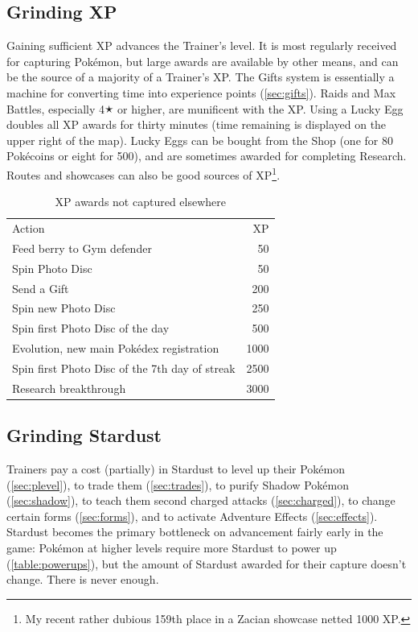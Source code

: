 \subsection{Grinding XP\label{subsec:getxp}}
Gaining sufficient XP advances the Trainer's level.
It is most regularly received for capturing Pokémon, but large awards are
  available by other means, and can be the source of a majority of a Trainer's XP.
The Gifts system is essentially a machine for converting
  time into experience points (\autoref{sec:gifts}).
Raids and Max Battles, especially 4🟉 or higher, are munificent with the XP.
Using a Lucky Egg doubles all XP awards for thirty minutes (time remaining is displayed on the upper right of the map).
Lucky Eggs can be bought from the Shop (one for 80 Pokécoins or eight for 500),
  and are sometimes awarded for completing Research.
Routes and showcases can also be good sources of XP\footnote{My recent rather dubious 159th place in a Zacian showcase netted 1000 XP\@.}.

\begin{table}
\centering
\begin{tabular}{lr}
Action & XP\\
\Midrule
  Feed berry to Gym defender & 50\\
  Spin Photo Disc & 50\\
  Send a Gift & 200\\
  Spin new Photo Disc & 250\\
  Spin first Photo Disc of the day & 500\\
  Evolution, new main Pokédex registration & 1000\\
  Spin first Photo Disc of the 7th day of streak & 2500\\
  Research breakthrough & 3000\\
\end{tabular}
\caption{XP awards not captured elsewhere\label{table:xpawards}}
\end{table}

\subsection{Grinding Stardust\label{subsec:getdust}}
Trainers pay a cost (partially) in Stardust
  to level up their Pokémon (\autoref{sec:plevel}),
  to trade them (\autoref{sec:trades}),
  to purify Shadow Pokémon (\autoref{sec:shadow}),
  to teach them second charged attacks (\autoref{sec:charged}),
  to change certain forms (\autoref{sec:forms}),
  and to activate Adventure Effects (\autoref{sec:effects}).
Stardust becomes the primary bottleneck on advancement fairly early in the game:
  Pokémon at higher levels require more Stardust to power up (\autoref{table:powerups}),
  but the amount of Stardust awarded for their capture doesn't change.
There is never enough.

